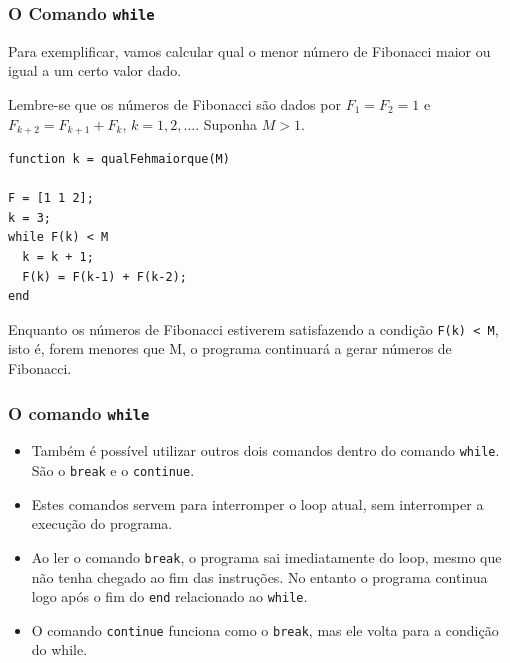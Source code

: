 \documentclass{beamer}
\begin{document}
\begin{frame}[fragile]
\frametitle{O Comando {\tt while}}

Para exemplificar, vamos calcular qual o menor n\'umero de Fibonacci maior ou igual a um certo valor dado.
\pause

Lembre-se que os n\'umeros de Fibonacci s\~ao dados por $F_1 = F_2 = 1$ e $F_{k+2}=F_{k+1}+F_k$, $k=1,2,\dots$. Suponha $M>1$.
\pause
{\scriptsize
\begin{verbatim}
function k = qualFehmaiorque(M)

F = [1 1 2];
k = 3;
while F(k) < M
  k = k + 1;
  F(k) = F(k-1) + F(k-2);
end
\end{verbatim}}

Enquanto os n\'umeros de Fibonacci estiverem satisfazendo a condi\c{c}\~ao {\tt F(k) < M}, isto \'e, forem menores que M, o programa continuar\'a a gerar n\'umeros de Fibonacci.
\end{frame}

\begin{frame}
\frametitle{O comando {\tt while}}

\begin{itemize}
 \item<1-> Tamb\'em \'e poss\'ivel utilizar outros dois comandos dentro do comando {\tt while}. S\~ao o {\tt break} e o {\tt continue}.
 \item<2-> Estes comandos servem para interromper o loop atual, sem interromper a execu\c{c}\~ao do programa.
 \item<3-> Ao ler o comando {\tt break}, o programa sai imediatamente do loop, mesmo que n\~ao tenha chegado ao fim das instru\c{c}\~oes. No entanto o programa continua logo ap\'os o fim do {\tt end} relacionado ao {\tt while}.
 \item<4-> O comando {\tt continue} funciona como o {\tt break}, mas ele volta para a condi\c{c}\~ao do while.
\end{itemize}

\end{frame}

\subsection[O Comando for]{}
\end{document}
